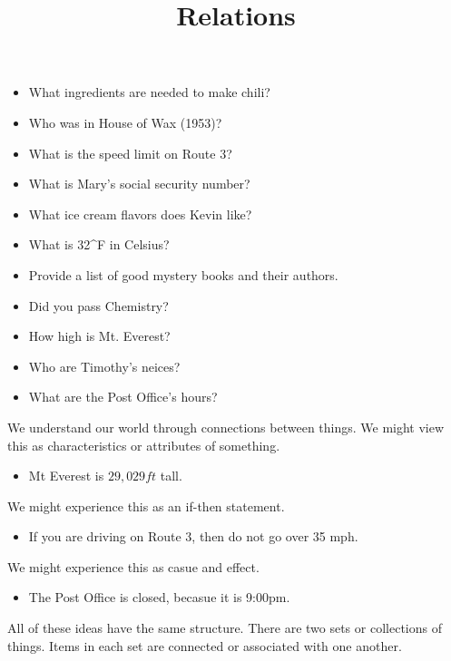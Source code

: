\documentclass{ximera}
\title{Relations}
\begin{document}
\begin{abstract}
\end{abstract}
\maketitle

\begin{model}

\begin{itemize}
\item What ingredients are needed to make chili?
\item Who was in House of Wax (1953)?
\item What is the speed limit on Route 3?
\item What is Mary's social security number?
\item What ice cream flavors does Kevin like?
\item What is 32^\circ F in Celsius?
\item Provide a list of good mystery books and their authors.
\item Did you pass Chemistry?
\item How high is Mt. Everest?
\item Who are Timothy's neices?
\item What are the Post Office's hours?
\end{itemize}

We understand our world through connections between things. We might view this as characteristics or attributes of something.  \\
\begin{itemize}
\item Mt Everest is $29,029 ft$ tall.
\end{itemize}


We might experience this as an if-then statement.
\begin{itemize}
\item If you are driving on Route 3, then do not go over 35 mph.
\end{itemize}



We might experience this as casue and effect.
\begin{itemize}
\item The Post Office is closed, becasue it is 9:00pm.
\end{itemize}



All of these ideas have the same structure.  There are two sets or collections of things.  Items in each set are connected or associated with one another.




\end{model}
\end{document}
